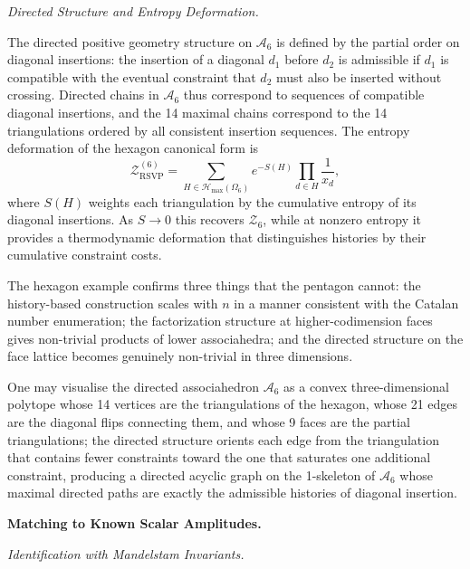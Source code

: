 \documentclass[11pt]{article}
\theoremstyle{plain}
\theoremstyle{definition}
\theoremstyle{remark}
\newcommand{\Sf}{S}
\newcommand{\OmKS}{\Omega}
\newcommand{\ZRSVP}{\mathcal{Z}_{\mathrm{RSVP}}}
\newcommand{\Hmax}{\mathcal{H}_{\max}}
\begin{document}
\medskip\noindent\textit{Directed Structure and Entropy Deformation.}

The directed positive geometry structure on $\mathcal{A}_6$ is defined by the partial order on diagonal insertions: the insertion of a diagonal $d_1$ before $d_2$ is admissible if $d_1$ is compatible with the eventual constraint that $d_2$ must also be inserted without crossing. Directed chains in $\mathcal{A}_6$ thus correspond to sequences of compatible diagonal insertions, and the 14 maximal chains correspond to the 14 triangulations ordered by all consistent insertion sequences. The entropy deformation of the hexagon canonical form is
\[
  \ZRSVP^{(6)} = \sum_{H \in \Hmax(\OmKS_6)} e^{-\Sf(H)} \prod_{d \in H} \frac{1}{x_d},
\]
where $\Sf(H)$ weights each triangulation by the cumulative entropy of its diagonal insertions. As $\Sf \to 0$ this recovers $\mathcal{Z}_6$, while at nonzero entropy it provides a thermodynamic deformation that distinguishes histories by their cumulative constraint costs.

The hexagon example confirms three things that the pentagon cannot: the history-based construction scales with $n$ in a manner consistent with the Catalan number enumeration; the factorization structure at higher-codimension faces gives non-trivial products of lower associahedra; and the directed structure on the face lattice becomes genuinely non-trivial in three dimensions.

One may visualise the directed associahedron $\mathcal{A}_6$ as a convex three-dimensional polytope whose 14 vertices are the triangulations of the hexagon, whose 21 edges are the diagonal flips connecting them, and whose 9 faces are the partial triangulations; the directed structure orients each edge from the triangulation that contains fewer constraints toward the one that saturates one additional constraint, producing a directed acyclic graph on the 1-skeleton of $\mathcal{A}_6$ whose maximal directed paths are exactly the admissible histories of diagonal insertion.

\bigskip\noindent\textbf{Matching to Known Scalar Amplitudes.}
\label{sec:matching}

\medskip\noindent\textit{Identification with Mandelstam Invariants.}
\end{document}
